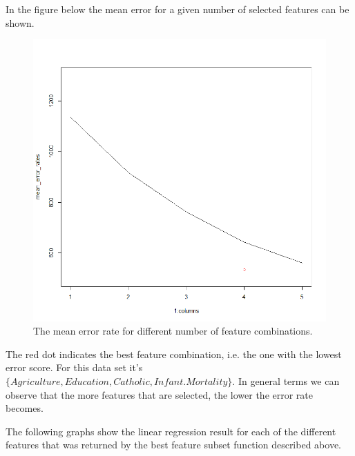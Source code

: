 \documentclass[a4paper,12pt]{article}
\begin{document}
In the figure below the mean error for a given number of selected features can be shown. 

\begin{figure}[H]
\centering
\begin{minipage}[]{0.5\textwidth}
  \includegraphics[width=\textwidth]{figures/Lab2A1_me_features.png}  
  \caption{The mean error rate for different number of feature combinations.\label{fig:features} }
 \end{minipage}
\end{figure}

The red dot indicates the best feature combination, i.e. the one with the lowest error score. For this data set it's \( \{Agriculture, Education, Catholic, Infant.Mortality\} \). In general terms we can observe that the more features that are selected, the lower the error rate becomes.

The following graphs show the linear regression result for each of the different features that was returned by the best feature subset function described above.
\end{document}
